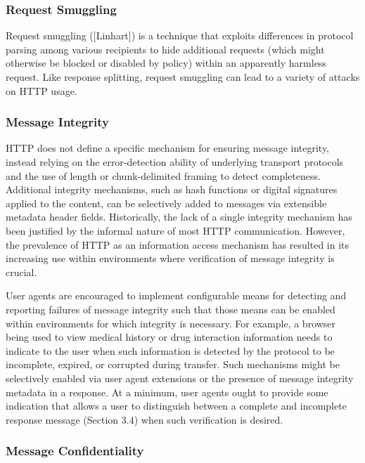 \subsubsection{Request Smuggling}

Request smuggling ([Linhart]) is a technique that exploits
differences in protocol parsing among various recipients to hide
additional requests (which might otherwise be blocked or disabled by
policy) within an apparently harmless request.  Like response
splitting, request smuggling can lead to a variety of attacks on HTTP
usage.


\subsubsection{Message Integrity}

HTTP does not define a specific mechanism for ensuring message
integrity, instead relying on the error-detection ability of
underlying transport protocols and the use of length or
chunk-delimited framing to detect completeness.  Additional integrity
mechanisms, such as hash functions or digital signatures applied to
the content, can be selectively added to messages via extensible
metadata header fields.  Historically, the lack of a single integrity
mechanism has been justified by the informal nature of most HTTP
communication.  However, the prevalence of HTTP as an information
access mechanism has resulted in its increasing use within
environments where verification of message integrity is crucial.

User agents are encouraged to implement configurable means for
detecting and reporting failures of message integrity such that those
means can be enabled within environments for which integrity is
necessary.  For example, a browser being used to view medical history
or drug interaction information needs to indicate to the user when
such information is detected by the protocol to be incomplete,
expired, or corrupted during transfer.  Such mechanisms might be
selectively enabled via user agent extensions or the presence of
message integrity metadata in a response.  At a minimum, user agents
ought to provide some indication that allows a user to distinguish
between a complete and incomplete response message (Section 3.4) when
such verification is desired.

\subsubsection{Message Confidentiality}

